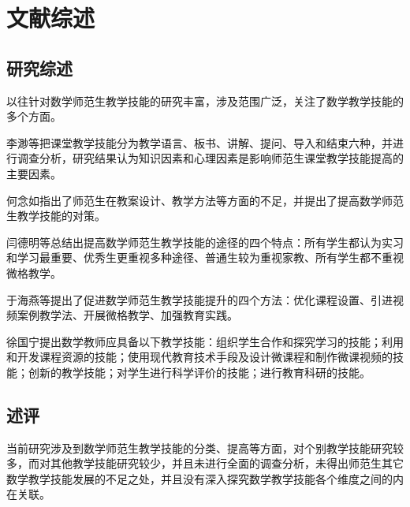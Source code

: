\chapter{文献综述}


\section{研究综述}

以往针对数学师范生教学技能的研究丰富，涉及范围广泛，关注了数学教学技能的多个方面。

李渺等把课堂教学技能分为教学语言、板书、讲解、提问、导入和结束六种，并进行调查分析，研究结果认为知识因素和心理因素是影响师范生课堂教学技能提高的主要因素\cite{李渺2009高师数学专业师范生课堂教学技能的调查研究}。

何念如指出了师范生在教案设计、教学方法等方面的不足，并提出了提高数学师范生教学技能的对策\cite{何念如数学师范生教学技能存在的问题及对策研究}。

闫德明等总结出提高数学师范生教学技能的途径的四个特点：所有学生都认为实习和学习最重要、优秀生更重视多种途径、普通生较为重视家教、所有学生都不重视微格教学\cite{闫德明提高数学师范生教学技能途径的调查分析}。

于海燕等提出了促进数学师范生教学技能提升的四个方法：优化课程设置、引进视频案例教学法、开展微格教学、加强教育实践\cite{于海燕2018数学师范生教学技能培养的研究}。

徐国宁提出数学教师应具备以下教学技能：组织学生合作和探究学习的技能；利用和开发课程资源的技能；使用现代教育技术手段及设计微课程和制作微课视频的技能；创新的教学技能；对学生进行科学评价的技能；进行教育科研的技能\cite{徐国宁2019新课程理念下数学教师应具备的教学技能}。



\section{述评}

当前研究涉及到数学师范生教学技能的分类、提高等方面，对个别教学技能研究较多，而对其他教学技能研究较少，并且未进行全面的调查分析，未得出师范生其它数学教学技能发展的不足之处，并且没有深入探究数学教学技能各个维度之间的内在关联。